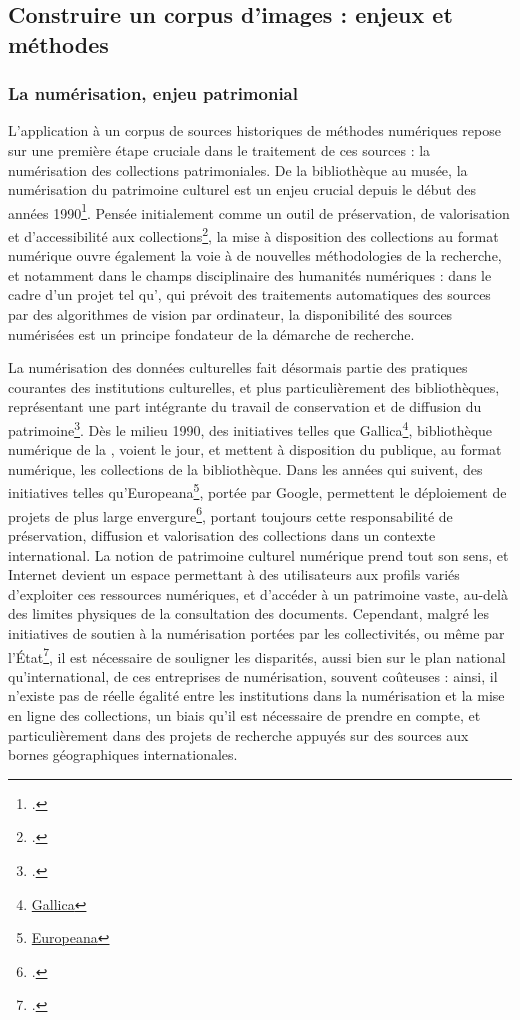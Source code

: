 
\subsection{Construire un corpus d’images : enjeux et méthodes}
        \subsubsection{La numérisation, enjeu patrimonial}
L'application à un corpus de sources historiques de méthodes numériques repose sur une première étape cruciale dans le traitement de ces sources : la numérisation des collections patrimoniales. De la bibliothèque au musée, la numérisation du patrimoine culturel est un enjeu crucial depuis le début des années 1990\footcite{baujardNumerisationPatrimoineCulturel2017}. Pensée initialement comme un outil de préservation, de valorisation et d'accessibilité aux collections\footcite{richardProgrammeNumerisationBibliotheque1993}, la mise à disposition des collections au format numérique ouvre également la voie à de nouvelles méthodologies de la recherche, et notamment dans le champs disciplinaire des humanités numériques : dans le cadre d'un projet tel qu'\eida, qui prévoit des traitements automatiques des sources par des algorithmes de vision par ordinateur, la disponibilité des sources numérisées est un principe fondateur de la démarche de recherche. 

La numérisation des données culturelles fait désormais partie des pratiques courantes des institutions culturelles, et plus particulièrement des bibliothèques, représentant une part intégrante du travail de conservation et de diffusion du patrimoine\footcite{claerrModeEmploi2017}. Dès le milieu 1990, des initiatives telles que Gallica\footnote{\href{https://gallica.bnf.fr/}{Gallica}}, bibliothèque numérique de la \bnf, voient le jour, et mettent à disposition du publique, au format numérique, les collections de la bibliothèque. Dans les années qui suivent, des initiatives telles qu'Europeana\footnote{\href{https://www.europeana.eu/fr}{Europeana}}, portée par Google, permettent le déploiement de projets de plus large envergure\footcite{claerrModeEmploi2017}, portant toujours cette responsabilité de préservation, diffusion et valorisation des collections dans un contexte international. La notion de patrimoine culturel numérique prend tout son sens, et Internet devient un espace permettant à des utilisateurs aux profils variés d'exploiter ces ressources numériques, et d'accéder à un patrimoine vaste, au-delà des limites physiques de la consultation des documents. Cependant, malgré les initiatives de soutien à la numérisation portées par les collectivités, ou même par l'État\footcite{claerrModeEmploi2017}, il est nécessaire de souligner les disparités, aussi bien sur le plan national qu'international, de ces entreprises de numérisation, souvent coûteuses : ainsi, il n'existe pas de réelle égalité entre les institutions dans la numérisation et la mise en ligne des collections, un biais qu'il est nécessaire de prendre en compte, et particulièrement dans des projets de recherche appuyés sur des sources aux bornes géographiques internationales. 

